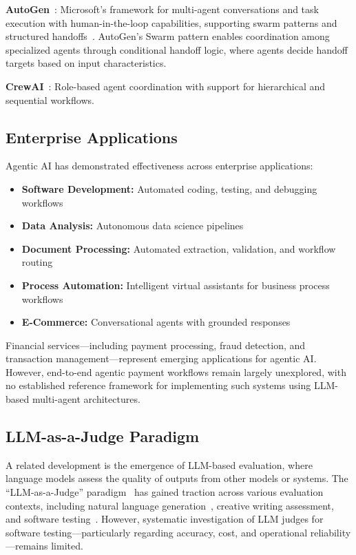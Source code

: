 \textbf{AutoGen}~\cite{wu2023autogen,dibia2024autogen}: Microsoft's framework for multi-agent conversations and task execution with human-in-the-loop capabilities, supporting swarm patterns and structured handoffs~\cite{autogen_swarm_docs,autogen_handoffs}. AutoGen's Swarm pattern enables coordination among specialized agents through conditional handoff logic, where agents decide handoff targets based on input characteristics.

\textbf{CrewAI}~\cite{crewai2024}: Role-based agent coordination with support for hierarchical and sequential workflows.

\subsection{Enterprise Applications}

Agentic AI has demonstrated effectiveness across enterprise applications:

\begin{itemize}[leftmargin=*]
    \item \textbf{Software Development:} Automated coding, testing, and debugging workflows~\cite{jimenez2024swe,islam-etal-2024-mapcoder}
    \item \textbf{Data Analysis:} Autonomous data science pipelines~\cite{hong2024datainterpreter}
    \item \textbf{Document Processing:} Automated extraction, validation, and workflow routing
    \item \textbf{Process Automation:} Intelligent virtual assistants for business process workflows~\cite{guan2024llmprocessautomation}
    \item \textbf{E-Commerce:} Conversational agents with grounded responses~\cite{zeng2025e-commerceconversation}
\end{itemize}

Financial services---including payment processing, fraud detection, and transaction management---represent emerging applications for agentic AI. However, end-to-end agentic payment workflows remain largely unexplored, with no established reference framework for implementing such systems using LLM-based multi-agent architectures.

\subsection{LLM-as-a-Judge Paradigm}

A related development is the emergence of LLM-based evaluation, where language models assess the quality of outputs from other models or systems. The ``LLM-as-a-Judge'' paradigm~\cite{zheng2023llmjudge} has gained traction across various evaluation contexts, including natural language generation~\cite{li-etal-2024-leveraging-large}, creative writing assessment, and software testing~\cite{alshahwan2024automated}. However, systematic investigation of LLM judges for software testing---particularly regarding accuracy, cost, and operational reliability---remains limited. 

